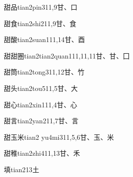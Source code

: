 \begin{EntryWithPhonetic}{甜品}{tian2pin3}{11,9}{⽢、⼝}
\end{EntryWithPhonetic}

\begin{EntryWithPhonetic}{甜食}{tian2shi2}{11,9}{⽢、⾷}
\end{EntryWithPhonetic}

\begin{EntryWithPhonetic}{甜酸}{tian2suan1}{11,14}{⽢、⾣}
\end{EntryWithPhonetic}

\begin{EntryWithPhonetic}{甜甜圈}{tian2tian2quan1}{11,11,11}{⽢、⽢、⼞}
\end{EntryWithPhonetic}

\begin{EntryWithPhonetic}{甜筒}{tian2tong3}{11,12}{⽢、⽵}
\end{EntryWithPhonetic}

\begin{EntryWithPhonetic}{甜头}{tian2tou5}{11,5}{⽢、⼤}
\end{EntryWithPhonetic}

\begin{EntryWithPhonetic}{甜心}{tian2xin1}{11,4}{⽢、⼼}
\end{EntryWithPhonetic}

\begin{EntryWithPhonetic}{甜言}{tian2yan2}{11,7}{⽢、⾔}
\end{EntryWithPhonetic}

\begin{EntryWithPhonetic}{甜玉米}{tian2 yu4mi3}{11,5,6}{⽢、⽟、⽶}
\end{EntryWithPhonetic}

\begin{EntryWithPhonetic}{甜稚}{tian2zhi4}{11,13}{⽢、⽲}
\end{EntryWithPhonetic}

\begin{EntryWithPhonetic}{填}{tian2}{13}{⼟}
\end{EntryWithPhonetic}

